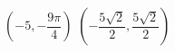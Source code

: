 { $\left( -5, -\dfrac{9\pi}{4} \right)$}
{ $\left( -\dfrac{5\sqrt{2}}{2}, \dfrac{5\sqrt{2}}{2} \right)$}
